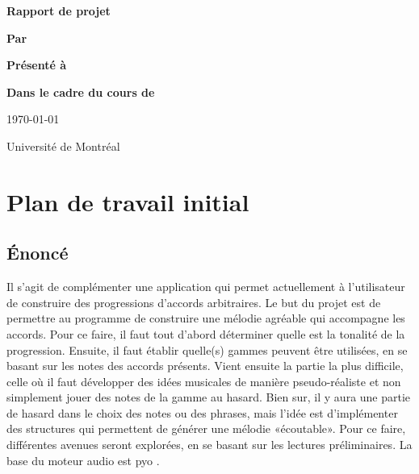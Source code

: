 \documentclass[letterpaper,12pt]{scrartcl}
\begin{document}
	\begin{center}
		\vspace{2cm}

		{\Huge\bf\sf Rapport de projet}
		\vspace{4cm}

		{\bf\sf Par}

		\vspace{0.5cm}{\large\bf\sf François Poitras}

		\vspace{2cm}

		{\bf\sf Présenté à}

		\vspace{0.5cm}{\large\bf\sf Olivier Bélanger et Sylvie Hamel}

		\vspace{2cm}

		{\bf\sf Dans le cadre du cours de}

		\vspace{0.5cm}{\large\bf\sf Projet d'informatique (IFT3150)}

		\vspace{\fill}
		
		\today

		\vspace{0.5cm}
		Université de Montréal
	\end{center}

	\newpage
	\tableofcontents
	\newpage
	\pagestyle{plain}
	\section{Plan de travail initial}
	
	\subsection{Énoncé}
	Il s'agit de complémenter une application qui permet actuellement à l'utilisateur de construire des progressions d'accords arbitraires. Le but du projet est de permettre au programme de construire une mélodie agréable qui accompagne les accords. Pour ce faire, il faut tout d'abord déterminer quelle est la tonalité de la progression. Ensuite, il faut établir quelle(s) gammes peuvent être utilisées, en se basant sur les notes des accords présents. Vient ensuite la partie la plus difficile, celle où il faut développer des idées musicales de manière pseudo-réaliste et non simplement jouer des notes de la gamme au hasard. Bien sur, il y aura une partie de hasard dans le choix des notes ou des phrases, mais l'idée est d'implémenter des structures qui permettent de générer une mélodie «écoutable». Pour ce faire, différentes avenues seront explorées, en se basant sur les lectures préliminaires. La base du moteur audio est pyo \cite{pyo}.
\end{document}
